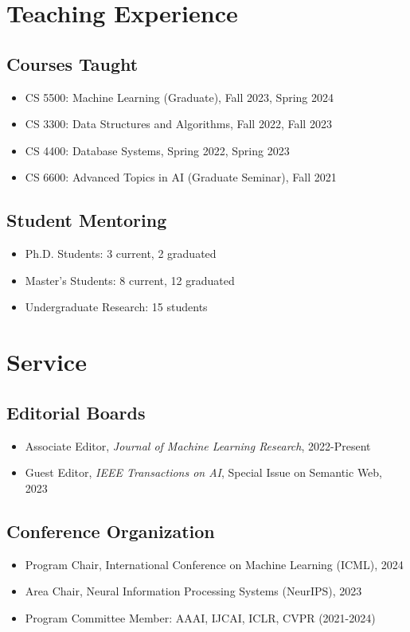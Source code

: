 \documentclass[11pt,a4paper]{article}
\begin{document}
\section{Teaching Experience}
\subsection{Courses Taught}
\begin{itemize}[leftmargin=*, topsep=0pt]
    \item CS 5500: Machine Learning (Graduate), Fall 2023, Spring 2024
    \item CS 3300: Data Structures and Algorithms, Fall 2022, Fall 2023
    \item CS 4400: Database Systems, Spring 2022, Spring 2023
    \item CS 6600: Advanced Topics in AI (Graduate Seminar), Fall 2021
\end{itemize}

\subsection{Student Mentoring}
\begin{itemize}[leftmargin=*, topsep=0pt]
    \item Ph.D. Students: 3 current, 2 graduated
    \item Master's Students: 8 current, 12 graduated
    \item Undergraduate Research: 15 students
\end{itemize}

\section{Service}
\subsection{Editorial Boards}
\begin{itemize}[leftmargin=*, topsep=0pt]
    \item Associate Editor, \textit{Journal of Machine Learning Research}, 2022-Present
    \item Guest Editor, \textit{IEEE Transactions on AI}, Special Issue on Semantic Web, 2023
\end{itemize}

\subsection{Conference Organization}
\begin{itemize}[leftmargin=*, topsep=0pt]
    \item Program Chair, International Conference on Machine Learning (ICML), 2024
    \item Area Chair, Neural Information Processing Systems (NeurIPS), 2023
    \item Program Committee Member: AAAI, IJCAI, ICLR, CVPR (2021-2024)
\end{itemize}
\end{document}
